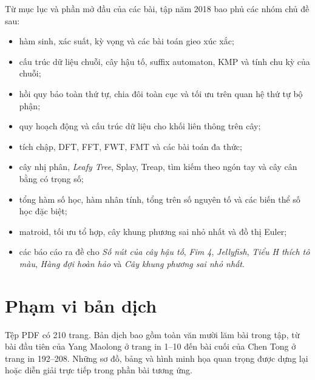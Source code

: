 \documentclass[11pt]{article}
\begin{document}
Từ mục lục và phần mở đầu của các bài, tập năm 2018 bao phủ các nhóm chủ đề
sau:
\begin{itemize}
  \item hàm sinh, xác suất, kỳ vọng và các bài toán gieo xúc xắc;
  \item cấu trúc dữ liệu chuỗi, cây hậu tố, suffix automaton, KMP và tính chu
  kỳ của chuỗi;
  \item hồi quy bảo toàn thứ tự, chia đôi toàn cục và tối ưu trên quan hệ thứ
  tự bộ phận;
  \item quy hoạch động và cấu trúc dữ liệu cho khối liên thông trên cây;
  \item tích chập, DFT, FFT, FWT, FMT và các bài toán đa thức;
  \item cây nhị phân, \emph{Leafy Tree}, Splay, Treap, tìm kiếm theo ngón tay và
  cây cân bằng có trọng số;
  \item tổng hàm số học, hàm nhân tính, tổng trên số nguyên tố và các biến thể
  số học đặc biệt;
  \item matroid, tối ưu tổ hợp, cây khung phương sai nhỏ nhất và đồ thị Euler;
  \item các báo cáo ra đề cho \emph{Số nút của cây hậu tố}, \emph{Fim 4},
  \emph{Jellyfish}, \emph{Tiểu H thích tô màu}, \emph{Hàng đợi hoàn hảo} và
  \emph{Cây khung phương sai nhỏ nhất}.
\end{itemize}

\section*{Phạm vi bản dịch}

Tệp PDF có 210 trang. Bản dịch bao gồm toàn văn mười lăm bài trong tập, từ bài
đầu tiên của Yang Maolong ở trang in 1--10 đến bài cuối của Chen Tong ở trang
in 192--208. Những sơ đồ, bảng và hình minh họa quan trọng được dựng lại hoặc
diễn giải trực tiếp trong phần bài tương ứng.
\end{document}
